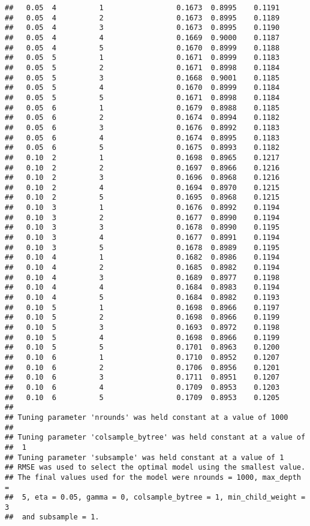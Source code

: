 \documentclass[]{article}
\begin{document}
\begin{verbatim}
##   0.05  4          1                 0.1673  0.8995    0.1191
##   0.05  4          2                 0.1673  0.8995    0.1189
##   0.05  4          3                 0.1673  0.8995    0.1190
##   0.05  4          4                 0.1669  0.9000    0.1187
##   0.05  4          5                 0.1670  0.8999    0.1188
##   0.05  5          1                 0.1671  0.8999    0.1183
##   0.05  5          2                 0.1671  0.8998    0.1184
##   0.05  5          3                 0.1668  0.9001    0.1185
##   0.05  5          4                 0.1670  0.8999    0.1184
##   0.05  5          5                 0.1671  0.8998    0.1184
##   0.05  6          1                 0.1679  0.8988    0.1185
##   0.05  6          2                 0.1674  0.8994    0.1182
##   0.05  6          3                 0.1676  0.8992    0.1183
##   0.05  6          4                 0.1674  0.8995    0.1183
##   0.05  6          5                 0.1675  0.8993    0.1182
##   0.10  2          1                 0.1698  0.8965    0.1217
##   0.10  2          2                 0.1697  0.8966    0.1216
##   0.10  2          3                 0.1696  0.8968    0.1216
##   0.10  2          4                 0.1694  0.8970    0.1215
##   0.10  2          5                 0.1695  0.8968    0.1215
##   0.10  3          1                 0.1676  0.8992    0.1194
##   0.10  3          2                 0.1677  0.8990    0.1194
##   0.10  3          3                 0.1678  0.8990    0.1195
##   0.10  3          4                 0.1677  0.8991    0.1194
##   0.10  3          5                 0.1678  0.8989    0.1195
##   0.10  4          1                 0.1682  0.8986    0.1194
##   0.10  4          2                 0.1685  0.8982    0.1194
##   0.10  4          3                 0.1689  0.8977    0.1198
##   0.10  4          4                 0.1684  0.8983    0.1194
##   0.10  4          5                 0.1684  0.8982    0.1193
##   0.10  5          1                 0.1698  0.8966    0.1197
##   0.10  5          2                 0.1698  0.8966    0.1199
##   0.10  5          3                 0.1693  0.8972    0.1198
##   0.10  5          4                 0.1698  0.8966    0.1199
##   0.10  5          5                 0.1701  0.8963    0.1200
##   0.10  6          1                 0.1710  0.8952    0.1207
##   0.10  6          2                 0.1706  0.8956    0.1201
##   0.10  6          3                 0.1711  0.8951    0.1207
##   0.10  6          4                 0.1709  0.8953    0.1203
##   0.10  6          5                 0.1709  0.8953    0.1205
## 
## Tuning parameter 'nrounds' was held constant at a value of 1000
## 
## Tuning parameter 'colsample_bytree' was held constant at a value of
##  1
## Tuning parameter 'subsample' was held constant at a value of 1
## RMSE was used to select the optimal model using the smallest value.
## The final values used for the model were nrounds = 1000, max_depth =
##  5, eta = 0.05, gamma = 0, colsample_bytree = 1, min_child_weight = 3
##  and subsample = 1.
\end{verbatim}
\end{document}
